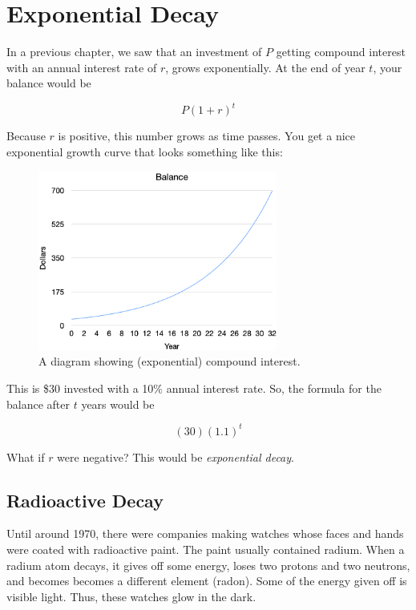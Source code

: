 \chapter{Exponential Decay}

In a previous chapter, we saw that an investment of $P$ getting
compound interest with an annual interest rate of $r$, grows
exponentially. At the end of year $t$, your balance would be

$$P\left(1 + r\right)^t$$

Because $r$ is positive, this number grows as time passes. You get a
nice exponential growth curve that looks something like this:
\begin{figure}[htbp]
    \centering
    \includegraphics[width=0.7\textwidth]{exponential_growth.png}
    \caption{A diagram showing (exponential) compound interest.}
    \label{fig:exponential_growth}
\end{figure}

This is \$30 invested with a 10\% annual interest rate. So, the formula
for the balance after $t$ years would be

$$(30)(1.1)^t$$

What if $r$ were negative? This would be \textit{exponential decay}.

\section{Radioactive Decay}

Until around 1970, there were companies making watches whose faces and
hands were coated with radioactive paint. The paint usually contained
radium. When a radium atom decays, it gives off some energy, loses two
protons and two neutrons, and becomes becomes a different element
(radon). Some of the energy given off is visible light. Thus, these
watches glow in the dark.

